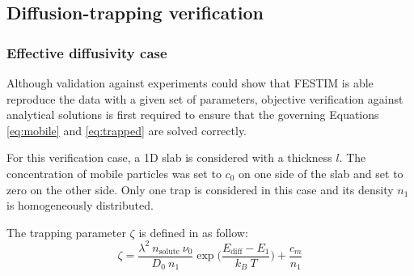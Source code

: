 \subsection{Diffusion-trapping verification}

\subsubsection{Effective diffusivity case} \label{analytical}

Although validation against experiments could show that FESTIM is able reproduce the data with a given set of parameters, objective verification against analytical solutions is first required to ensure that the governing Equations \ref{eq:mobile} and \ref{eq:trapped} are solved correctly.

For this verification case, a 1D slab is considered with a thickness $l$.
The concentration of mobile particles was set to $c_0$ on one side of the slab and set to zero on the other side.
Only one trap is considered in this case and its density $n_1$ is homogeneously distributed.

The trapping parameter $\zeta$ is defined in  as follow:
\begin{equation}
    \zeta = \frac{\lambda^2 \: n_\mathrm{solute} \: \nu_0}{D_0 \: n_1}\exp\bigg(\frac{E_\mathrm{diff} - E_1}{k_B \: T}\bigg) + \frac{c_m}{n_1}
\end{equation}

